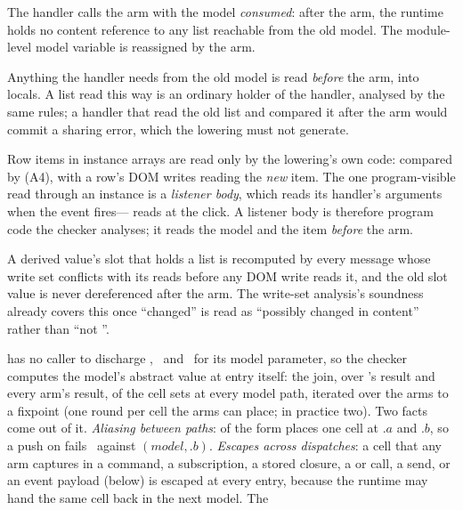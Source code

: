 \begin{description}[leftmargin=1.2em,font=\normalfont\itshape]
\item[Hand-over.] The handler calls the arm with the model \emph{consumed}: after the arm, the runtime
holds no content reference to any list reachable from the old model. The module-level model variable
is reassigned by the arm.
\item[Reads before the arm.] Anything the handler needs from the old model is read \emph{before} the
arm, into locals. A list read this way is an ordinary holder of the handler, analysed by the same
rules; a handler that read the old list and compared it after the arm would commit a sharing error,
which the lowering must not generate.
\item[Item reads.] Row items in instance arrays are read only by the lowering's own code: compared by
\code{===} (A4), with a row's DOM writes reading the \emph{new} item. The one program-visible read
through an instance is a \emph{listener body}, which reads its handler's arguments when the event
fires--- reads  at the click. A listener body is
therefore program code the checker analyses; it reads the model and the item \emph{before} the arm.
\item[Slots.] A derived value's slot that holds a list is recomputed by every message whose write set
conflicts with its reads before any DOM write reads it, and the old slot value is never dereferenced
after the arm. The write-set analysis's soundness already covers this once ``changed'' is read as
``possibly changed in content'' rather than ``not \code{===}''.
\item[Entry fixpoint.]  has no caller to discharge \Unescaped, \Dead\ and \Disjoint\ for
its model parameter, so the checker computes the model's abstract value at entry itself: the join, over
's result and every arm's result, of the cell sets at every model path, iterated over the
arms to a fixpoint (one round per cell the arms can place; in practice two). Two facts come out of it.
\emph{Aliasing between paths}:  of the form 
places one cell at $.a$ and $.b$, so a push on  fails \Disjoint\ against
$(\mathit{model}, .b)$. \emph{Escapes across dispatches}: a cell that any arm captures in a command,
a subscription, a stored closure, a  or  call, a send, or an event payload (below)
is escaped at every entry, because the runtime may hand the same cell back in the next model. The

\end{description}
